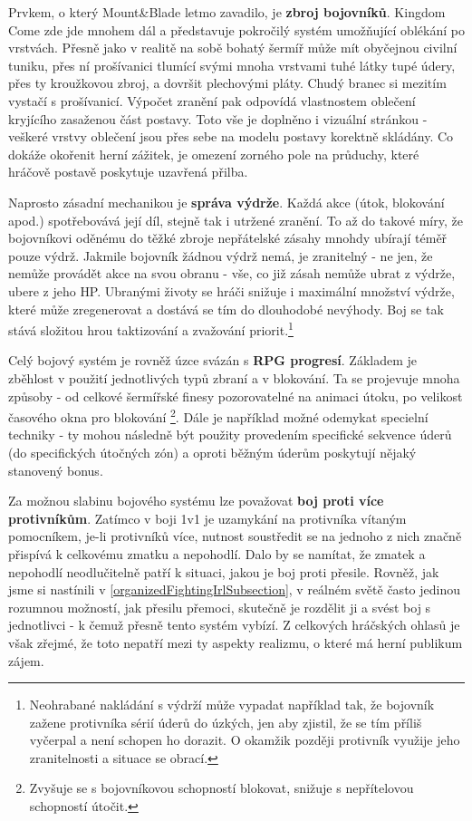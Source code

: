 Prvkem, o který Mount\&Blade letmo zavadilo, je \textbf{zbroj bojovníků}. Kingdom Come zde jde mnohem dál a představuje pokročilý systém umožňující oblékání po vrstvách. Přesně jako v realitě na sobě bohatý šermíř může mít obyčejnou civilní tuniku, přes ní prošívanici tlumící svými mnoha vrstvami tuhé látky tupé údery, přes ty kroužkovou zbroj, a dovršit plechovými pláty. Chudý branec si mezitím vystačí s prošívanicí. Výpočet zranění pak odpovídá vlastnostem oblečení kryjícího zasaženou část postavy. Toto vše je doplněno i vizuální stránkou - veškeré vrstvy oblečení jsou přes sebe na modelu postavy korektně skládány. Co dokáže okořenit herní zážitek, je omezení zorného pole na průduchy, které hráčově postavě poskytuje uzavřená přilba. 

Naprosto zásadní mechanikou je \textbf{správa výdrže}. Každá akce (útok, blokování apod.) spotřebovává její díl, stejně tak i utržené zranění. To až do takové míry, že bojovníkovi oděnému do těžké zbroje nepřátelské zásahy mnohdy ubírají téměř pouze výdrž. Jakmile bojovník žádnou výdrž nemá, je zranitelný - ne jen, že nemůže provádět akce na svou obranu - vše, co již zásah nemůže ubrat z výdrže, ubere z jeho \acs{HP}. Ubranými životy se hráči snižuje i maximální množství výdrže, které může zregenerovat a dostává se tím do dlouhodobé nevýhody. Boj se tak stává složitou hrou taktizování a zvažování priorit.\footnote{Neohrabané nakládání s výdrží může vypadat například tak, že bojovník zažene protivníka sérií úderů do úzkých, jen aby zjistil, že se tím příliš vyčerpal a není schopen ho dorazit. O okamžik později protivník využije jeho zranitelnosti a situace se obrací.}  

Celý bojový systém je rovněž úzce svázán s \textbf{\acs{RPG} progresí}. Základem je zběhlost v použití jednotlivých typů zbraní a v blokování. Ta se projevuje mnoha způsoby - od celkové šermířské finesy pozorovatelné na animaci útoku, po velikost časového okna pro blokování \footnote{Zvyšuje se s bojovníkovou schopností blokovat, snižuje s nepřítelovou schopností útočit.}. Dále je například možné odemykat specielní techniky - ty mohou následně být použity provedením specifické sekvence úderů (do specifických útočných zón) a oproti běžným úderům poskytují nějaký stanovený bonus.

Za možnou slabinu bojového systému lze považovat \textbf{boj proti více protivníkům}. Zatímco v boji 1v1 je uzamykání na protivníka vítaným pomocníkem, je-li protivníků více, nutnost soustředit se na jednoho z nich značně přispívá k celkovému zmatku a nepohodlí. Dalo by se namítat, že zmatek a nepohodlí neodlučitelně patří k situaci, jakou je boj proti přesile. Rovněž, jak jsme si nastínili v \ref{organizedFightingIrlSubsection}, v reálném světě často jedinou rozumnou možností, jak přesilu přemoci, skutečně je rozdělit ji a svést boj s jednotlivci - k čemuž přesně tento systém vybízí. Z celkových hráčských ohlasů je však zřejmé, že toto nepatří mezi ty aspekty realizmu, o které má herní publikum zájem.

